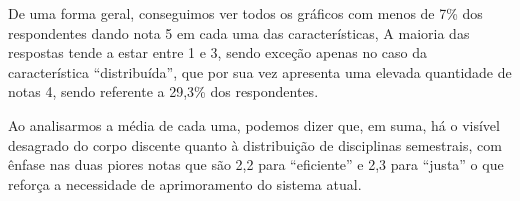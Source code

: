 \begin{apendicesenv}

  De uma forma geral, conseguimos ver todos os gráficos com menos de 7\% dos respondentes dando nota 5 em cada uma das características, A maioria das respostas tende a estar entre 1 e 3, sendo exceção apenas no caso da característica ``distribuída'', que por sua vez apresenta uma elevada quantidade de notas 4, sendo referente a 29,3\% dos respondentes.

  Ao analisarmos a média de cada uma, podemos dizer que, em suma, há o visível desagrado do corpo discente quanto à distribuição de disciplinas semestrais, com ênfase nas duas piores notas que são 2,2 para ``eficiente'' e 2,3 para ``justa'' o que reforça a necessidade de aprimoramento do sistema atual.


\end{apendicesenv}
